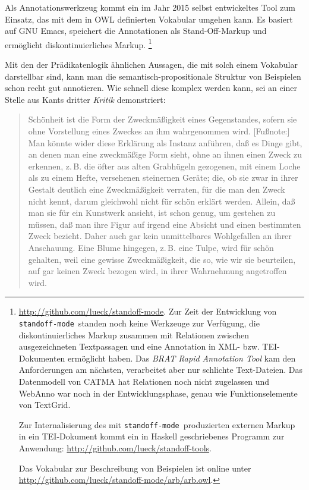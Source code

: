 \documentclass{article}
\newcommand*{\lit}{\textit}%
\newcommand*{\englisch}[1]{\foreignlanguage{english}{\textit{#1}}}%
\newcommand*{\som}{\texttt{standoff-mode}}%
\begin{document}
Als Annotationswerkzeug kommt ein im Jahr 2015 selbst entwickeltes
Tool zum Einsatz, das mit dem in OWL definierten Vokabular umgehen
kann. Es basiert auf GNU Emacs, speichert die Annotationen als
Stand-Off-Markup und ermöglicht diskontinuierliches Markup.%
\footnote{\url{http://github.com/lueck/standoff-mode}. Zur Zeit der
  Entwicklung von \som\ standen noch keine Werkzeuge zur Verfügung,
  die diskontinuierliches Markup zusammen mit Relationen zwischen
  ausgezeichneten Textpassagen und eine Annotation in XML-
  bzw. TEI-Dokumenten ermöglicht haben. Das \englisch{BRAT Rapid
    Annotation Tool} kam den Anforderungen am nächsten, verarbeitet
  aber nur schlichte Text-Dateien. Das Datenmodell von CATMA hat
  Relationen noch nicht zugelassen und WebAnno war noch in der
  Entwicklungsphase, genau wie Funktionselemente von TextGrid.\par
  Zur Internalisierung des mit \som\ produzierten externen Markup in
  ein TEI-Dokument kommt ein in Haskell geschriebenes Programm zur
  Anwendung: \url{http://github.com/lueck/standoff-tools}.\par
  Das Vokabular zur Beschreibung von Beispielen ist online unter
  \url{http://github.com/lueck/standoff-mode/arb/arb.owl}.} %

Mit den der Prädikatenlogik ähnlichen Aussagen, die mit solch einem
Vokabular darstellbar sind, kann man die semantisch-propositionale
Struktur von Beispielen schon recht gut annotieren. Wie schnell diese
komplex werden kann, sei an einer Stelle aus Kants dritter
\lit{Kritik} \parencite[\pno\,77\psq\ (§\,17)]{KantKdU} demonstriert:

\begin{quote}
  Schönheit ist die Form der Zweckmäßigkeit eines Gegenstandes, sofern
  sie ohne Vorstellung eines Zweckes an ihm wahrgenommen
  wird. [Fußnote:] Man könnte wider diese Erklärung als Instanz
  anführen, daß es Dinge gibt, an denen man eine zweckmäßige Form
  sieht, ohne an ihnen einen Zweck zu erkennen, z.\,B. die öfter aus
  alten Grabhügeln gezogenen, mit einem Loche als zu einem Hefte,
  versehenen steinernen Geräte; die, ob sie zwar in ihrer Gestalt
  deutlich eine Zweckmäßigkeit verraten, für die man den Zweck nicht
  kennt, darum gleichwohl nicht für schön erklärt werden. Allein, daß
  man sie für ein Kunstwerk ansieht, ist schon genug, um gestehen zu
  müssen, daß man ihre Figur auf irgend eine Absicht und einen
  bestimmten Zweck bezieht. Daher auch gar kein unmittelbares
  Wohlgefallen an ihrer Anschauung. Eine Blume hingegen, z.\,B. eine
  Tulpe, wird für schön gehalten, weil eine gewisse Zweckmäßigkeit,
  die so, wie wir sie beurteilen, auf gar keinen Zweck bezogen wird,
  in ihrer Wahrnehmung angetroffen wird.
\end{quote}
\end{document}
